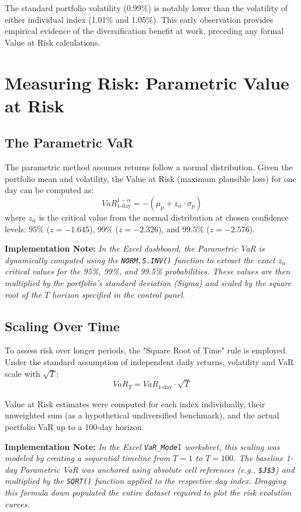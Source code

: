 \documentclass{report}
\begin{document}
The standard portfolio volatility (0.99\%) is notably lower than the volatility of either individual index (1.01\% and 1.05\%). This early observation provides empirical evidence of the diversification benefit at work, preceding any formal Value at Risk calculations.

\section{Measuring Risk: Parametric Value at Risk}

\subsection{The Parametric VaR}
The parametric method assumes returns follow a normal distribution. Given the portfolio mean and volatility, the Value at Risk (maximum plausible loss) for one day can be computed as:
\[ VaR_{1\text{-day}}^{1-\alpha} = -\left(\mu_p + z_{\alpha} \cdot \sigma_p\right) \]
where $z_{\alpha}$ is the critical value from the normal distribution at chosen confidence levels: $95\%$ ($z = -1.645$), $99\%$ ($z = -2.326$), and $99.5\%$ ($z = -2.576$).

\textbf{Implementation Note:} \textit{In the Excel dashboard, the Parametric VaR is dynamically computed using the \texttt{NORM.S.INV()} function to extract the exact $z_{\alpha}$ critical values for the 95\%, 99\%, and 99.5\% probabilities. These values are then multiplied by the portfolio's standard deviation (Sigma) and scaled by the square root of the $T$ horizon specified in the control panel.}

\subsection{Scaling Over Time}
To assess risk over longer periods, the "Square Root of Time" rule is employed. Under the standard assumption of independent daily returns, volatility and VaR scale with $\sqrt{T}$:
\[ VaR_{T} = VaR_{1\text{-day}} \cdot \sqrt{T} \]

Value at Risk estimates were computed for each index individually, their unweighted sum (as a hypothetical undiversified benchmark), and the actual portfolio VaR up to a 100-day horizon. 

\textbf{Implementation Note:} \textit{In the Excel \texttt{VaR\_Model} worksheet, this scaling was modeled by creating a sequential timeline from $T=1$ to $T=100$. The baseline 1-day Parametric VaR was anchored using absolute cell references (e.g., \texttt{\$J\$3}) and multiplied by the \texttt{SQRT()} function applied to the respective day index. Dragging this formula down populated the entire dataset required to plot the risk evolution curves.}
\end{document}
